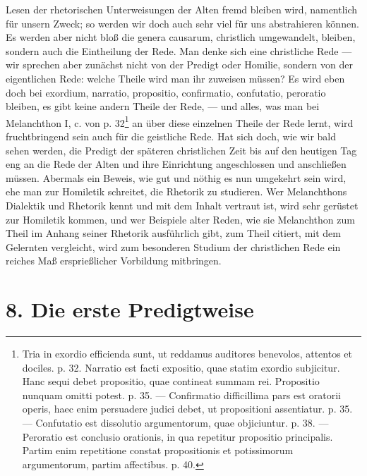 Lesen der rhetorischen Unterweisungen der Alten fremd bleiben wird, namentlich für unsern Zweck; so werden wir doch auch sehr viel für uns abstrahieren können. Es werden aber nicht bloß die genera causarum, christlich umgewandelt, bleiben, sondern auch die Eintheilung der Rede. Man denke sich eine christliche Rede — wir sprechen aber zunächst nicht von der Predigt oder Homilie, sondern von der eigentlichen Rede: welche Theile wird man ihr zuweisen müssen? Es wird eben doch bei exordium, narratio, propositio, confirmatio, confutatio, peroratio bleiben, es gibt keine andern Theile der Rede, — und alles, was man bei Melanchthon I, c. von p. 32\footnote{Tria in exordio efficienda sunt, ut reddamus auditores benevolos, attentos et dociles. p. 32. Narratio est facti expositio, quae statim exordio subjicitur. Hanc sequi debet propositio, quae contineat summam rei. Propositio nunquam omitti potest. p. 35. — Confirmatio difficillima pars est oratorii operis, haec enim persuadere judici debet, ut propositioni assentiatur. p. 35. — Confutatio est dissolutio argumentorum, quae objiciuntur. p. 38. — Peroratio est conclusio orationis, in qua repetitur propositio principalis. Partim enim repetitione constat propositionis et potissimorum argumentorum, partim affectibus. p. 40.} an über diese einzelnen Theile der Rede lernt, wird
fruchtbringend sein auch für die geistliche Rede. Hat sich doch, wie wir bald sehen werden, die Predigt der späteren christlichen Zeit bis auf den heutigen Tag eng an die Rede der Alten und ihre Einrichtung angeschlossen und anschließen müssen. Abermals ein Beweis, wie gut und nöthig es nun umgekehrt sein wird, ehe man zur Homiletik schreitet, die Rhetorik zu studieren. Wer Melanchthons Dialektik und Rhetorik kennt und mit dem Inhalt vertraut ist, wird sehr gerüstet zur Homiletik kommen, und wer Beispiele alter Reden, wie sie Melanchthon zum Theil im Anhang seiner Rhetorik ausführlich gibt, zum Theil citiert, mit dem Gelernten vergleicht, wird zum besonderen Studium der christlichen Rede ein reiches Maß ersprießlicher Vorbildung mitbringen.

\section{8. Die erste Predigtweise}

